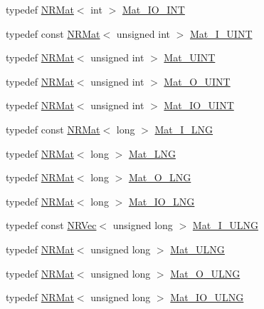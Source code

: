 \begin{DoxyCompactItemize}
\item 
typedef \mbox{\hyperlink{classNR_1_1NRMat}{N\+R\+Mat}}$<$ int $>$ \mbox{\hyperlink{namespaceNR_a84800a4c22e55fbe1e67161483bac3a9}{Mat\+\_\+\+I\+O\+\_\+\+I\+NT}}
\item 
typedef const \mbox{\hyperlink{classNR_1_1NRMat}{N\+R\+Mat}}$<$ unsigned int $>$ \mbox{\hyperlink{namespaceNR_af959eaecb622b961ae87ec7258f0fda3}{Mat\+\_\+\+I\+\_\+\+U\+I\+NT}}
\item 
typedef \mbox{\hyperlink{classNR_1_1NRMat}{N\+R\+Mat}}$<$ unsigned int $>$ \mbox{\hyperlink{namespaceNR_a01f5d86042bd4919f04d9a7b6dec8c60}{Mat\+\_\+\+U\+I\+NT}}
\item 
typedef \mbox{\hyperlink{classNR_1_1NRMat}{N\+R\+Mat}}$<$ unsigned int $>$ \mbox{\hyperlink{namespaceNR_a538dd5b6ad9cfb6f7196c64e50f67065}{Mat\+\_\+\+O\+\_\+\+U\+I\+NT}}
\item 
typedef \mbox{\hyperlink{classNR_1_1NRMat}{N\+R\+Mat}}$<$ unsigned int $>$ \mbox{\hyperlink{namespaceNR_aa00c34c0788f7a1ac5f7d7969e4f3cd8}{Mat\+\_\+\+I\+O\+\_\+\+U\+I\+NT}}
\item 
typedef const \mbox{\hyperlink{classNR_1_1NRMat}{N\+R\+Mat}}$<$ long $>$ \mbox{\hyperlink{namespaceNR_a743683745c8482fdcc884b1c720724fc}{Mat\+\_\+\+I\+\_\+\+L\+NG}}
\item 
typedef \mbox{\hyperlink{classNR_1_1NRMat}{N\+R\+Mat}}$<$ long $>$ \mbox{\hyperlink{namespaceNR_ac504afbbcf367d0268a82fb2d9944ff5}{Mat\+\_\+\+L\+NG}}
\item 
typedef \mbox{\hyperlink{classNR_1_1NRMat}{N\+R\+Mat}}$<$ long $>$ \mbox{\hyperlink{namespaceNR_a45b2c8ac10b33b50d1c39bbb7f5be21c}{Mat\+\_\+\+O\+\_\+\+L\+NG}}
\item 
typedef \mbox{\hyperlink{classNR_1_1NRMat}{N\+R\+Mat}}$<$ long $>$ \mbox{\hyperlink{namespaceNR_abb2210688d9255481fd052afcacb022a}{Mat\+\_\+\+I\+O\+\_\+\+L\+NG}}
\item 
typedef const \mbox{\hyperlink{classNR_1_1NRVec}{N\+R\+Vec}}$<$ unsigned long $>$ \mbox{\hyperlink{namespaceNR_ab203ca7a3abe14655f8d67302282a7d8}{Mat\+\_\+\+I\+\_\+\+U\+L\+NG}}
\item 
typedef \mbox{\hyperlink{classNR_1_1NRMat}{N\+R\+Mat}}$<$ unsigned long $>$ \mbox{\hyperlink{namespaceNR_a6eba03f3bb664e5dd9de82a8d03beb66}{Mat\+\_\+\+U\+L\+NG}}
\item 
typedef \mbox{\hyperlink{classNR_1_1NRMat}{N\+R\+Mat}}$<$ unsigned long $>$ \mbox{\hyperlink{namespaceNR_ac6e0098423dff001af25e38b4ee35ecf}{Mat\+\_\+\+O\+\_\+\+U\+L\+NG}}
\item 
typedef \mbox{\hyperlink{classNR_1_1NRMat}{N\+R\+Mat}}$<$ unsigned long $>$ \mbox{\hyperlink{namespaceNR_ad39bb0df7e57ea005a5334cc659f5743}{Mat\+\_\+\+I\+O\+\_\+\+U\+L\+NG}}

\end{DoxyCompactItemize}
